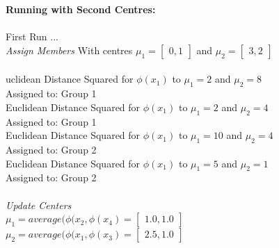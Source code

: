\documentclass[12pt,letterpaper]{article}
\begin{document}
\begin{enumerate}
\begin{enumerate}
                    \textbf{Running with Second Centres:} \\ \\
                    First Run ... \\
                    \textit{Assign Members} With centres  $\mu_{1} =  \begin{bmatrix}0, 1\end{bmatrix}$  and $\mu_{2} = \begin{bmatrix}3, 2\end{bmatrix}$ \\ \\
                    uclidean Distance Squared for $\phi (x_{1})$ to $\mu_{1} = 2 $ and $\mu_{2} = 8$ \\
                    Assigned to: Group 1 \\
                    Euclidean Distance Squared for $\phi (x_{1})$ to $\mu_{1} = 2 $ and $\mu_{2} = 4$ \\
                    Assigned to: Group 1 \\
                    Euclidean Distance Squared for $\phi (x_{1})$ to $\mu_{1} = 10 $ and $\mu_{2} = 4$ \\
                    Assigned to: Group 2 \\
                    Euclidean Distance Squared for $\phi (x_{1})$ to $\mu_{1} = 5 $ and $\mu_{2} = 1$ \\
                    Assigned to: Group 2 \\ \\
                    \textit{Update Centers} \\
                    $\mu_{1} = average(\phi (x_{2}, \phi (x_{4}) =  \begin{bmatrix} 1.0, 1.0 \end{bmatrix} $ \\
                    $\mu_{2} = average(\phi (x_{1}, \phi (x_{3}) =  \begin{bmatrix} 2.5, 1.0 \end{bmatrix}$ \\ \\
                    

\end{enumerate}
\end{enumerate}
\end{document}
